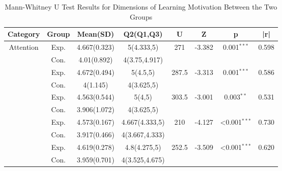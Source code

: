 \documentclass[runningheads]{llncs}
\begin{document}
\begin{table}[t]
\centering
\setlength{\tabcolsep}{3.4pt} %
\caption{Mann-Whitney U Test Results for Dimensions of Learning Motivation Between the Two Groups}
\label{tab:learning-motivation}
\begin{tabularx}{\textwidth}{cccccccc}
\toprule
\textbf{Category} & \textbf{Group} & \textbf{Mean(SD)} & \textbf{Q2(Q1,Q3)} & \textbf{U} & \textbf{Z} & \textbf{p} & \textbf{|r|} \\
\midrule
\multirow{2}{*}{Attention} 
& Exp. & 4.667(0.323) & 5(4.333,5) & \multirow{2}{*}{271} & \multirow{2}{*}{-3.382} & \multirow{2}{*}{0.001\(^{***}\)} & \multirow{2}{*}{0.598} \\
& Con. & 4.01(0.892) & 4(3.75,4.917) \\
\addlinespace
\multirow{2}{*}{Relevance} 
& Exp. & 4.672(0.494) & 5(4.5,5) & \multirow{2}{*}{287.5} & \multirow{2}{*}{-3.313} & \multirow{2}{*}{0.001\(^{***}\)} & \multirow{2}{*}{0.586} \\
& Con. & 4(1.145) & 4(3.625,5) \\
\addlinespace
\multirow{2}{*}{Confidence} 
& Exp. & 4.563(0.544) & 5(4,5) & \multirow{2}{*}{303.5} & \multirow{2}{*}{-3.001} & \multirow{2}{*}{0.003\(^{**}\)} & \multirow{2}{*}{0.531} \\
& Con. & 3.906(1.072) & 4(3.625,5) \\
\addlinespace
\multirow{2}{*}{Satisfaction} 
& Exp. & 4.573(0.167) & 4.667(4.333,5) & \multirow{2}{*}{210} & \multirow{2}{*}{-4.127} & \multirow{2}{*}{<0.001\(^{***}\)} & \multirow{2}{*}{0.730} \\
& Con. & 3.917(0.466) & 4(3.667,4.333) \\
\addlinespace
\multirow{2}{*}{Total} 
& Exp. & 4.619(0.278) & 4.8(4.275,5) & \multirow{2}{*}{252.5} & \multirow{2}{*}{-3.509} & \multirow{2}{*}{<0.001\(^{***}\)} & \multirow{2}{*}{0.620} \\
& Con. & 3.959(0.701) & 4(3.525,4.675) \\
\bottomrule
\end{tabularx}
\end{table}
\end{document}
